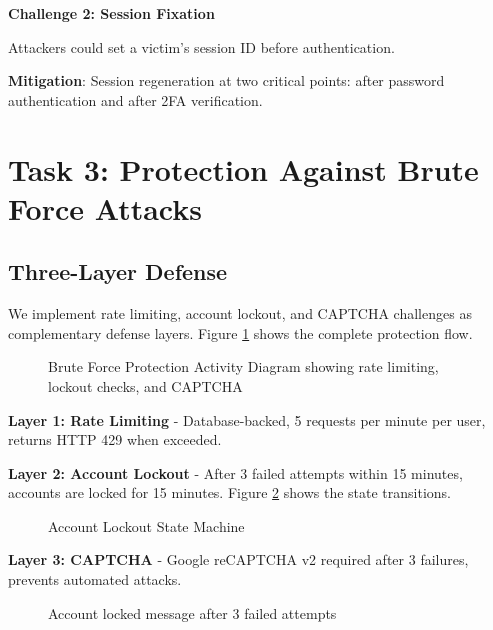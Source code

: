 \documentclass[12pt,a4paper]{article}
\begin{document}
\textbf{Challenge 2: Session Fixation}

Attackers could set a victim's session ID before authentication.

\textbf{Mitigation}: Session regeneration at two critical points: after password authentication and after 2FA verification.

\section{Task 3: Protection Against Brute Force Attacks}

\subsection{Three-Layer Defense}

We implement rate limiting, account lockout, and CAPTCHA challenges as complementary defense layers. Figure \ref{fig:brute_force} shows the complete protection flow.

\begin{figure}[H]
    \centering
    
    \caption{Brute Force Protection Activity Diagram showing rate limiting, lockout checks, and CAPTCHA}
    \label{fig:brute_force}
\end{figure}

\textbf{Layer 1: Rate Limiting} - Database-backed, 5 requests per minute per user, returns HTTP 429 when exceeded.

\textbf{Layer 2: Account Lockout} - After 3 failed attempts within 15 minutes, accounts are locked for 15 minutes. Figure \ref{fig:lockout_state} shows the state transitions.

\begin{figure}[H]
    \centering
    
    \caption{Account Lockout State Machine}
    \label{fig:lockout_state}
\end{figure}

\textbf{Layer 3: CAPTCHA} - Google reCAPTCHA v2 required after 3 failures, prevents automated attacks.

\begin{figure}[H]
    \centering
    \caption{Account locked message after 3 failed attempts}
    \label{fig:lockout_screen}
\end{figure}
\end{document}
